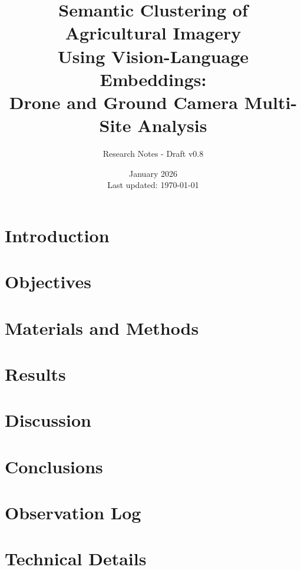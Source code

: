\documentclass[11pt,a4paper]{article}
\title{Semantic Clustering of Agricultural Imagery\\Using Vision-Language Embeddings:\\Drone and Ground Camera Multi-Site Analysis}
\author{Research Notes - Draft v0.8}
\date{January 2026 \\ \small Last updated: \today}
\begin{document}
\maketitle

\begin{abstract}

\end{abstract}

\tableofcontents
\newpage

\section{Introduction}
\label{sec:introduction}


\section{Objectives}
\label{sec:objectives}


\section{Materials and Methods}
\label{sec:methods}


\section{Results}
\label{sec:results}


\section{Discussion}
\label{sec:discussion}


\section{Conclusions}
\label{sec:conclusions}


\appendix
\section{Observation Log}
\label{app:observations}


\section{Technical Details}
\label{app:technical}


% 
\end{document}
